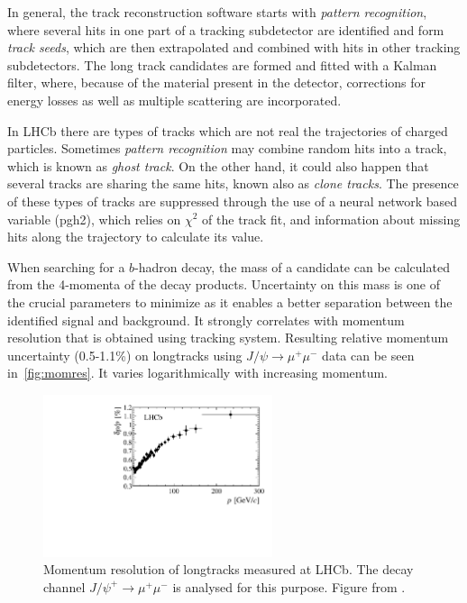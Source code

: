 In general, the track reconstruction software starts with \textit{pattern recognition}, where several hits in one part of a tracking subdetector are identified and form \textit{track seeds}, which are then extrapolated and combined with hits in other tracking subdetectors. The long track candidates are formed and fitted with a Kalman filter\cite{Hierk:684697}, where, because of the material present in the detector, corrections for energy losses as well as multiple scattering are incorporated.

In \gls{LHCb} there are types of tracks which are not real the trajectories of charged particles.
Sometimes \textit{pattern recognition} may combine random hits into a track, which is known as \textit{ghost track}. On the other hand, it could also happen that several tracks are sharing the same hits, known also as \textit{clone tracks}. The presence of these types of tracks are suppressed through the use of a neural network based variable (\Gls{pgh2}), which relies on $\chi^{2}$ of the track fit, and information about missing hits along the trajectory to calculate its value.

When searching for a $b$-hadron decay, the mass of a candidate can be calculated from the 4-momenta of the decay products. Uncertainty on this mass is one of the crucial parameters to minimize as it enables a better separation between the identified signal and background. It strongly correlates with momentum resolution that is obtained using tracking system. Resulting relative momentum uncertainty (0.5-1.1\%) on \gls{longtrack}s using $J/\psi \rightarrow \mu^{+} \mu^{-}$ data can be seen in~\autoref{fig:momres}. It varies logarithmically with increasing momentum.


\begin{figure}[!h]
	\centering
	\includegraphics[width = 0.6\textwidth]{figs/detector/Fig17.pdf}
	\caption{Momentum resolution of \gls{longtrack}s measured at \gls{LHCb}. The decay channel $J/\psi^{+} \rightarrow \mu^{+} \mu^{-}$ is analysed for this purpose. Figure from \cite{LHCb-DP-2014-002}.}
	\label{fig:momres}
\end{figure}

